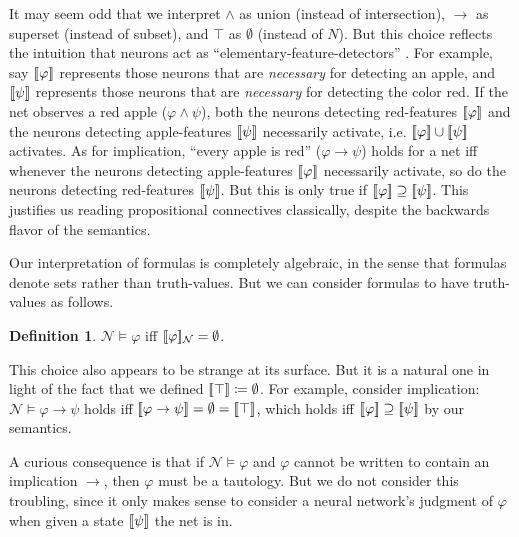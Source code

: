 \documentclass[letterpaper]{article}
\theoremstyle{definition}
\newtheorem{definition}{Definition}
\newcommand{\semantics}[1]{[\![\mbox{\em $ #1 $\/}]\!]}
\newcommand{\Net}{\mathcal{N}}
\begin{document}
It may seem odd that we interpret $\land$ as union (instead of intersection), $\to$ as superset (instead of subset), and $\top$ as $\emptyset$ (instead of $N$).  But this choice reflects the intuition that neurons act as ``elementary-feature-detectors'' \cite{leitgeb2001nonmonotonic}.  
For example, say $\semantics{\varphi}$ represents those neurons that are \textit{necessary} for detecting an apple, and $\semantics{\psi}$ represents those neurons that are \textit{necessary} for detecting the color red. 
If the net observes a red apple ($\varphi \land \psi$), both the neurons detecting red-features $\semantics{\varphi}$ and the neurons detecting apple-features $\semantics{\psi}$ necessarily activate, i.e. $\semantics{\varphi} \cup \semantics{\psi}$ activates.  As for implication, ``every apple is red'' (${\varphi \to \psi}$) holds for a net iff whenever the neurons detecting apple-features $\semantics{\varphi}$ necessarily activate, so do the neurons detecting red-features $\semantics{\psi}$.  But this is only true if ${\semantics{\varphi} \supseteq \semantics{\psi}}$.  This justifies us reading propositional connectives classically, despite the backwards flavor of the semantics.


Our interpretation of formulas is completely algebraic, in the sense that formulas denote sets rather than truth-values.  But we can consider formulas to have truth-values as follows.

\begin{definition}
$\Net \models \varphi$ iff $\semantics{\varphi}_\Net = \emptyset$.
\end{definition}

This choice also appears to be strange at its surface.  But it is a natural one in light of the fact that we defined $\semantics{\top} \coloneqq \emptyset$.  For example, consider implication: $\Net \models \varphi \to \psi$ holds iff $\semantics{\varphi \to \psi} = \emptyset = \semantics{\top}$, which holds iff $\semantics{\varphi} \supseteq \semantics{\psi}$ by our semantics.

A curious consequence is that if $\Net \models \varphi$ and $\varphi$ cannot be written to contain an implication $\to$, then $\varphi$ must be a tautology.  But we do not consider this troubling, since it only makes sense to consider a neural network's judgment of $\varphi$ when given a state $\semantics{\psi}$ the net is in.
\end{document}
